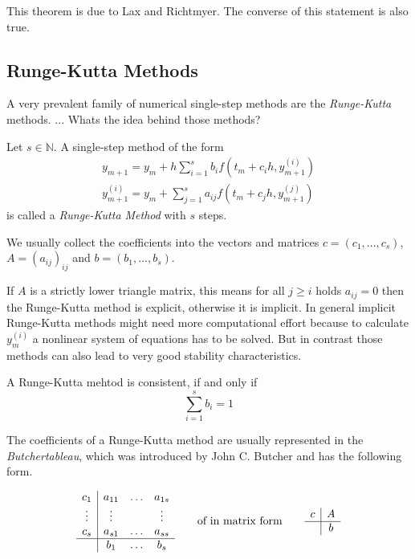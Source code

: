 	This theorem is due to Lax and Richtmyer. The converse of this statement is also true. 

	\subsection{Runge-Kutta Methods}
		A very prevalent family of numerical single-step methods are the \emph{Runge-Kutta} methods. ... Whats the idea behind those methods?
		
		\begin{definition}
			Let $s \in \mathbb{N}$. A single-step method of the form
			\begin{align}
				y_{m+1} = y_m + h \sum_{i=1}^{s} b_i f(t_m + c_ih, y_{m+1}^{(i)}) \\ 
				y_{m+1}^{(i)} = y_m +  \sum_{j=1}^{s} a_{ij} f(t_m + c_jh, y_{m+1}^{(j)})
			\end{align}
			is called a \emph{Runge-Kutta Method} with $s$ steps.
		\end{definition}
		
		We usually collect the coefficients into the vectors and matrices $c=(c_1, ...,c_s)$, $A = (a_{ij})_{ij}$ and $b=(b_1, ..., b_s)$.
		
		If $A$ is a strictly lower triangle matrix, this means for all $j \geq i$ holds $a_{ij} = 0$ then the Runge-Kutta method is explicit, otherwise it is implicit. In general implicit Runge-Kutta methods might need more computational effort because to calculate $y_m^{(i)}$ a nonlinear system of equations has to be solved. But in contrast those methods can also lead to very good stability characteristics.
		
		\begin{lemma}%
			A Runge-Kutta mehtod is consistent, if and only if
			\begin{displaymath}
				\sum_{i=1}^{s} b_i = 1
			\end{displaymath}
		\end{lemma}
		
		The coefficients of a Runge-Kutta method are usually represented in the \emph{Butchertableau}, which was introduced by John C. Butcher and has the following form.
		
		\begin{displaymath}
			\begin{array}{c|ccc}
				c_1 & a_{11} & \dots & a_{1s} \\
				\vdots & \vdots & & \vdots \\
				c_s & a_{s1} & \dots & a_{ss} \\
				\hline
				 & b_1 & \dots & b_s
			\end{array}
			\qquad
			\text{of in matrix form}
			\qquad
			\begin{array}{c|c}
				c & A \\
				\hline
				 & b
			\end{array}
		\end{displaymath}
		
